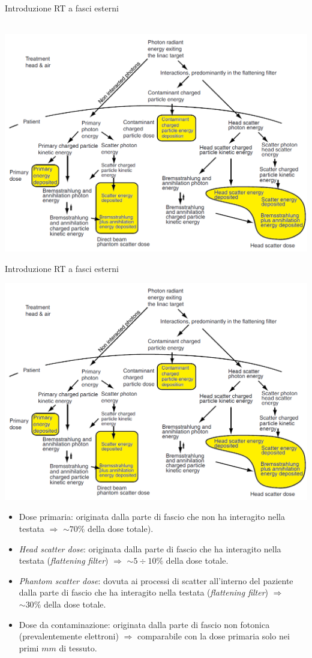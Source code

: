 \documentclass{beamer}
\begin{document}
\begin{frame}{Introduzione RT a fasci esterni}
\begin{center}
\small
{}\\ \vspace{.2cm}
\includegraphics[width=.8\textwidth]{../cap1/processes.PNG}
\end{center}
\end{frame}



\begin{frame}{Introduzione RT a fasci esterni}
\begin{center}
\small
\includegraphics[width=.6\textwidth]{../cap1/processes.PNG}
\end{center}
\begin{itemize}
\scriptsize
\item \alert{Dose primaria:} originata dalla parte di fascio che non ha interagito nella testata $\Rightarrow$ $\sim 70\%$ della dose totale).
\item \alert{\textit{Head scatter dose}:} originata dalla parte di fascio che ha interagito nella testata (\textit{flattening filter}) $\Rightarrow$ $\sim 5\div 10\%$ della dose totale.
\item \alert{\textit{Phantom scatter dose}:} dovuta ai processi di scatter all'interno del paziente dalla parte di fascio che ha interagito nella testata (\textit{flattening filter}) $\Rightarrow$ $\sim 30\%$ della dose totale.
\item \alert{Dose da contaminazione:} originata dalla parte di fascio non fotonica (prevalentemente elettroni) $\Rightarrow$ comparabile con la dose primaria solo nei primi $mm$ di tessuto.
\end{itemize}
\end{frame}
\end{document}
